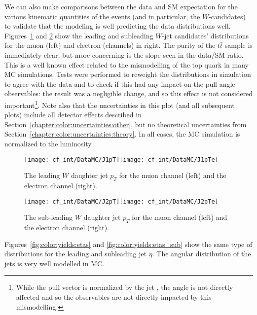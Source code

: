 We can also make comparisons between the data and SM expectation for the various kinematic quantities of the events (and in particular, the $W$-candidates) to validate that the modeling is well predicting the data distributions well. Figures~\ref{fig:color:yields:pts} and \ref{fig:color:yields:pts_sub} show the leading and subleading $W$-jet candidates' \pt distributions for the muon (left) and electron (channels) in right. The purity of the $t\bar{t}$ sample is immediately clear, but more concerning is the slope seen in the data/SM ratio. This is a well known effect related to the mismodelling of the top quark \pt in many MC simulations. Tests were performed to reweight the \pt distributions in simulation to agree with the data and to check if this had any impact on the pull angle observables: the result was a negligible change, and so this effect is not considered important\footnote{While the pull vector is normalized by the jet \pt, the angle is not directly affected and so the observables are not directly impacted by this mismodelling.}. Note also that the uncertainties in this plot (and all subsequent plots) include all detector effects described in Section~\ref{chapter:color:uncertainties:other}, but no theoretical uncertainties from Section~\ref{chapter:color:uncertainties:theory}. In all cases, the MC simulation is normalized to the luminosity.


\begin{figure}[h!]
\begin{center}
\texttt{[image: cf\_int/DataMC/J1pT]}\texttt{[image: cf\_int/DataMC/J1pTe]}
 \caption{The leading $W$ daughter jet $p_T$ for the muon channel (left) and the electron channel (right).}
 \label{fig:color:yields:pts}
  \end{center}
\end{figure}

\begin{figure}[h!]
\begin{center}
\texttt{[image: cf\_int/DataMC/J2pT]}\texttt{[image: cf\_int/DataMC/J2pTe]}
 \caption{The sub-leading $W$ daughter jet $p_T$ for the muon channel (left) and the electron channel (right).}
 \label{fig:color:yields:pts_sub}
  \end{center}
\end{figure}



Figures~\ref{fig:color:yields:etas} and \ref{fig:color:yields:etas_sub} show the same type of distributions for the leading and subleading jet $\eta$. The angular distribution of the jets is very well modelled in MC.

